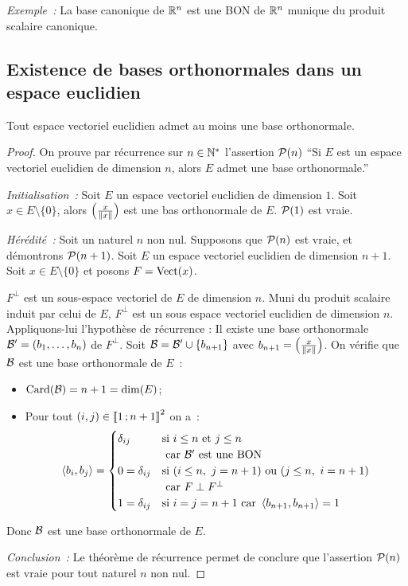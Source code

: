 \emph{Exemple~:} La base canonique de $\R^n$ est une BON de $\R^n$ munique du produit scalaire canonique.

\subsection{Existence de bases orthonormales dans un espace euclidien}

\begin{theo}
  Tout espace vectoriel euclidien admet au moins une base orthonormale.
\end{theo}
\begin{proof}
  On prouve par récurrence sur $n \in \N^{*}$ l'assertion $\P(n)$ ``Si $E$ est un espace vectoriel euclidien de dimension $n$, alors $E$ admet une base orthonormale.''

\emph{Initialisation~:} Soit $E$ un espace vectoriel euclidien de dimension $1$. Soit $x \in E\setminus\{0\}$, alors $\left(\frac{x}{\norme{x}}\right)$ est une bas orthonormale de $E$. $\P(1)$ est vraie.

\emph{Hérédité~:} Soit un naturel $n$ non nul. Supposons que $\P(n)$ est vraie, et démontrons $\P(n+1)$. Soit $E$ un espace vectoriel euclidien de dimension $n+1$. Soit $x \in E\setminus\{0\}$ et posons $F = \VectEngendre(x)$.

$F^\perp$ est un sous-espace vectoriel de $E$ de dimension $n$. Muni du produit scalaire induit par celui de $E$, $F^\perp$ est un sous espace vectoriel euclidien de dimension $n$. Appliquons-lui l'hypothèse de récurrence : Il existe une base orthonormale $\B'=(b_1, \ldots, b_n)$ de $F^\perp$. Soit $\B=\B'\cup\{b_{n+1}\}$ avec $b_{n+1}=\left(\frac{x}{\norme{x}}\right)$. On vérifie que $\B$ est une base orthonormale de $E$~:
\begin{itemize}
\item $\Card(\B)=n+1=\Dim(E)$;
\item Pour tout $(i,j) \in \intervalleentier{1}{n+1}^2$ on a~:
  \begin{equation}
    \prodscal{b_i}{b_j} = \begin{cases}
      \delta_{ij} & \text{si~} i \leq n \text{~et~} j \leq n \\
      & \text{~car~} \B' \text{~est une BON} \\
      0 = \delta_{ij} & \text{si~} (i \leq n, \ j=n+1) \text{~ou~} (j \leq n, \ i=n+1) \\
      &  \text{~car~} F \perp F^{\perp} \\
      1 = \delta_{ij} & \text{si~} i=j=n+1 \text{~car~} \prodscal{b_{n+1}}{b_{n+1}}=1
      \end{cases}
  \end{equation}
\end{itemize}
Donc $\B$ est une base orthonormale de $E$.

\emph{Conclusion~:} Le théorème de récurrence permet de conclure que l'assertion $\P(n)$ est vraie pour tout naturel $n$ non nul.
\end{proof}

